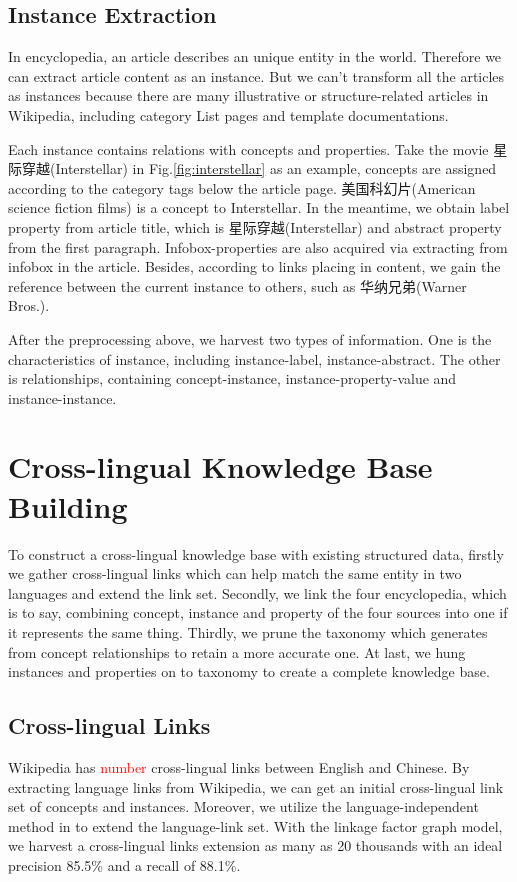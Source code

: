 \documentclass[runningheads,a4paper]{llncs}
\begin{document}
\subsection{Instance Extraction}
\label{sec:ie}
In encyclopedia, an article describes an unique entity in the world. Therefore we can extract article content as an instance. But we can't transform all the articles as instances because there are many illustrative or structure-related articles in Wikipedia, including category List pages and template documentations.

Each instance contains relations with concepts and properties. Take the movie 星际穿越(Interstellar) in Fig.\ref{fig:interstellar} as an example, concepts are assigned according to the category tags below the article page. 美国科幻片(American science fiction films) is a concept to Interstellar. In the meantime, we obtain label property from article title, which is 星际穿越(Interstellar) and abstract property from the first paragraph. Infobox-properties are also acquired via extracting from infobox in the article. Besides, according to links placing in content, we gain the reference between the current instance to others, such as 华纳兄弟(Warner Bros.).

After the preprocessing above, we harvest two types of information. One is the characteristics of instance, including instance-label, instance-abstract. The other is relationships, containing concept-instance, instance-property-value and instance-instance.

\section{Cross-lingual Knowledge Base Building}
\label{sec:clkbb}
To construct a cross-lingual knowledge base with existing structured data, firstly we gather cross-lingual links which can help match the same entity in two languages and extend the link set. Secondly, we link the four encyclopedia, which is to say, combining concept, instance and property of the four sources into one if it represents the same thing. Thirdly, we prune the taxonomy which generates from concept relationships to retain a more accurate one. At last, we hung instances and properties on to taxonomy to create a complete knowledge base.

\subsection{Cross-lingual Links}
Wikipedia has \textcolor{red}{number} cross-lingual links between English and Chinese. By extracting language links from Wikipedia, we can get an initial cross-lingual link set of concepts and instances. Moreover, we utilize the language-independent method in \cite{wang2012cross} to extend the language-link set. With the linkage factor graph model, we harvest a cross-lingual links extension as many as 20 thousands with an ideal precision 85.5\% and a recall of 88.1\%.
\end{document}
